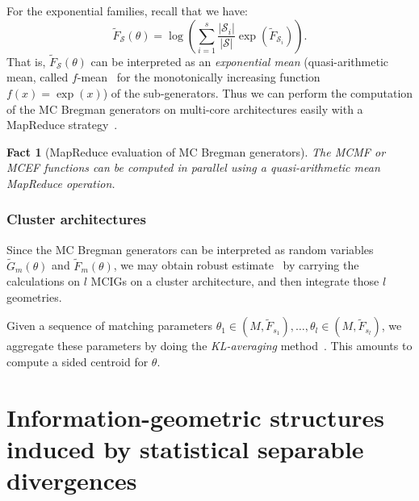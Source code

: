 \documentclass[graybox]{svmult}
\def\tildeF{\tilde{F}}
\def\tildeG{\tilde{G}}
\def\calS{\mathcal{S}}
\newtheorem{fact}{Fact}
\begin{document}
For the exponential families, recall that we have:
\begin{equation}\label{eq:}
\tildeF_{\calS}(\theta)=\log \left( \sum_{i=1}^s \frac{|\calS_i|}{|\calS|} \exp(\tildeF_{\calS_i}) \right).
\end{equation}
That is, $\tildeF_{\calS}(\theta)$ can be interpreted as an {\em exponential mean} (quasi-arithmetic mean, called $f$-mean~\cite{BR-2011} for the monotonically increasing function $f(x)=\exp(x)$) of the sub-generators.
Thus we can perform the computation of the MC Bregman generators on multi-core architectures easily with a MapReduce strategy~\cite{hpc-2016}.


\begin{fact}[MapReduce evaluation of MC Bregman generators]
The MCMF or MCEF functions can be computed in parallel using a quasi-arithmetic mean MapReduce operation.
\end{fact}

\subsubsection{Cluster architectures}

Since the MC Bregman generators can be interpreted as  random variables $\tildeG_{m}(\theta)$ and $\tildeF_{m}(\theta)$, 
we may obtain robust estimate~\cite{Pelletier-2005} by carrying the calculations on $l$ MCIGs on a cluster architecture, and then integrate those $l$ geometries.

Given a sequence of matching parameters $\theta_1\in (M,\tildeF_{s_1}),\ldots, \theta_l\in (M,\tildeF_{s_l})$, we aggregate these parameters by doing the {\em KL-averaging} method~\cite{KLaveraging-2014}. This amounts to compute a sided centroid for $\theta$.

\section{Information-geometric structures induced by statistical separable divergences}\label{sec:separablediv}
\end{document}
